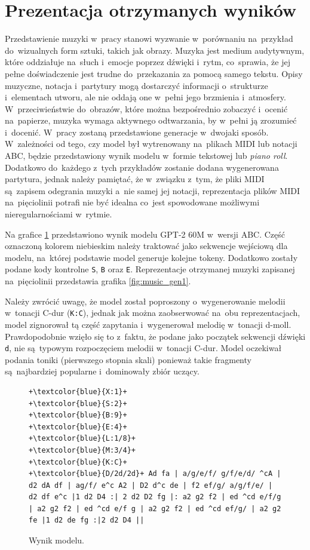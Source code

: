 \documentclass[data-science]{agh-wi} %
\begin{document}
\section{Prezentacja otrzymanych wyników}
Przedstawienie muzyki w~pracy stanowi wyzwanie w~porównaniu na~przykład do~wizualnych form sztuki, takich jak obrazy. Muzyka jest medium audytywnym, które oddziałuje na~słuch i~emocje poprzez dźwięki i~rytm, co~sprawia, że jej pełne doświadczenie jest trudne do~przekazania za pomocą samego tekstu. Opisy muzyczne, notacja i~partytury mogą dostarczyć informacji o~strukturze i~elementach utworu, ale nie oddają one w~pełni jego brzmienia i~atmosfery. W~przeciwieństwie do~obrazów, które można bezpośrednio zobaczyć i~ocenić na~papierze, muzyka wymaga aktywnego odtwarzania, by w~pełni ją zrozumieć i~docenić. W~pracy zostaną przedstawione generacje w~dwojaki sposób. W~zależności od tego, czy model był wytrenowany na~plikach MIDI lub notacji ABC, będzie przedstawiony wynik modelu w~formie tekstowej lub \textit{piano roll}. Dodatkowo do~każdego z~tych przykładów zostanie dodana wygenerowana partytura, jednak należy pamiętać, że w~związku z~tym, że pliki MIDI są~zapisem odegrania muzyki a~nie samej jej notacji, reprezentacja plików MIDI na~pięciolinii potrafi nie być idealna co~jest spowodowane możliwymi nieregularnościami w~rytmie.

Na grafice \ref*{code:music_gen1} przedstawiono wynik modelu GPT-2 60M w~wersji ABC. Część oznaczoną kolorem niebieskim należy traktować jako sekwencje wejściową dla modelu, na~której podstawie model generuje kolejne tokeny. Dodatkowo zostały podane kody kontrolne \texttt{S}, \texttt{B} oraz \texttt{E}. Reprezentacje otrzymanej muzyki zapisanej na~pięciolinii przedstawia grafika \ref*{fig:music_gen1}.

Należy zwrócić uwagę, że model został poproszony o~wygenerowanie melodii w~tonacji C-dur (\texttt{K:C}), jednak jak można zaobserwować na~obu reprezentacjach, model zignorował tą część zapytania i~wygenerował melodię w~tonacji d-moll. Prawdopodobnie wzięło się to z~faktu, że podane jako początek sekwencji dźwięki \texttt{d}, nie są~typowym rozpoczęciem melodii w~tonacji C-dur. Model oczekiwał podania toniki (pierwszego stopnia skali) ponieważ takie fragmenty są~najbardziej popularne i~dominowały zbiór uczący. 

\begin{figure}[ht!]
    \begin{verbatim}
+\textcolor{blue}{X:1}+
+\textcolor{blue}{S:2}+
+\textcolor{blue}{B:9}+
+\textcolor{blue}{E:4}+
+\textcolor{blue}{L:1/8}+
+\textcolor{blue}{M:3/4}+
+\textcolor{blue}{K:C}+
+\textcolor{blue}{D/2d/2d}+ Ad fa | a/g/e/f/ g/f/e/d/ ^cA | d2 dA df | ag/f/ e^c A2 | D2 d^c de | f2 ef/g/ a/g/f/e/ | d2 df e^c |1 d2 D4 :| 2 d2 D2 fg |: a2 g2 f2 | ed ^cd e/f/g | a2 g2 f2 | ed ^cd e/f g | a2 g2 f2 | ed ^cd ef/g/ | a2 g2 fe |1 d2 de fg :|2 d2 D4 ||
    \end{verbatim}
    \caption{Wynik modelu.}\label{code:music_gen1}
\end{figure}
\end{document}
